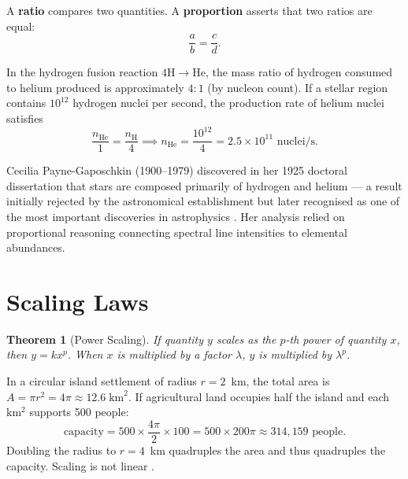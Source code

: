 \documentclass[11pt, openany]{book}
\theoremstyle{plain}
\newtheorem{theorem}{Theorem}[chapter]
\theoremstyle{definition}
\theoremstyle{remark}
\begin{document}
A \textbf{ratio} compares two quantities. A \textbf{proportion} asserts that
two ratios are equal:
\[
  \frac{a}{b}=\frac{c}{d}.
\]

\begin{myexample}
In the hydrogen fusion reaction $4\mathrm{H}\to\mathrm{He}$, the mass ratio of
hydrogen consumed to helium produced is approximately $4:1$ (by nucleon count).
If a stellar region contains $10^{12}$ hydrogen nuclei per second, the
production rate of helium nuclei satisfies
\[
  \frac{n_\mathrm{He}}{1}=\frac{n_\mathrm{H}}{4}
  \implies n_\mathrm{He}=\frac{10^{12}}{4}=2.5\times10^{11}\text{ nuclei/s}.
\]
\end{myexample}

\begin{history}
Cecilia Payne-Gaposchkin (1900--1979) discovered in her 1925 doctoral
dissertation that stars are composed primarily of hydrogen and helium --- a
result initially rejected by the astronomical establishment but later
recognised as one of the most important discoveries in astrophysics
\citep{PayneGaposchkin1925}. Her analysis relied on proportional reasoning
connecting spectral line intensities to elemental abundances.
\end{history}

\section{Scaling Laws}

\begin{theorem}[Power Scaling]
If quantity $y$ scales as the $p$-th power of quantity $x$, then $y=kx^p$.
When $x$ is multiplied by a factor $\lambda$, $y$ is multiplied by $\lambda^p$.
\end{theorem}

\begin{myexample}
In a circular island settlement of radius $r=2$~km, the total area is
$A=\pi r^2=4\pi\approx12.6\;\text{km}^2$. If agricultural land occupies
half the island and each km$^2$ supports 500 people:
\[
  \text{capacity} = 500\times\frac{4\pi}{2}\times100
  = 500\times200\pi\approx314{,}159\text{ people}.
\]
Doubling the radius to $r=4$~km quadruples the area and thus quadruples the
capacity. Scaling is not linear \citep{LeGuin1974}.
\end{myexample}
\end{document}
